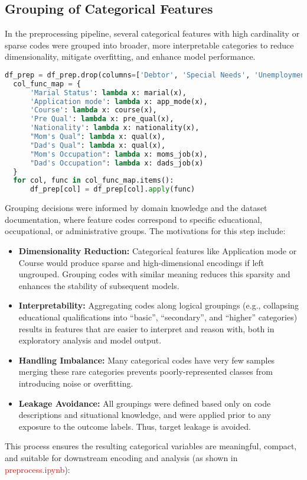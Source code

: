 \documentclass[twoside,final]{hcmut-report}
\begin{document}
\subsection{Grouping of Categorical Features}
In the preprocessing pipeline, several categorical features with high cardinality or sparse codes were grouped into broader, more interpretable categories to reduce dimensionality, mitigate overfitting, and enhance model performance.
\begin{lstlisting}[language=python]
  df_prep = df_prep.drop(columns=['Debtor', 'Special Needs', 'Unemployment rate', 'Inflation rate', 'GDP'])
  col_func_map = {
      'Marial Status': lambda x: marial(x),
      'Application mode': lambda x: app_mode(x),
      'Course': lambda x: course(x),
      'Pre Qual': lambda x: pre_qual(x),
      'Nationality': lambda x: nationality(x),
      "Mom's Qual": lambda x: qual(x),
      "Dad's Qual": lambda x: qual(x),
      "Mom's Occupation": lambda x: moms_job(x),
      "Dad's Occupation": lambda x: dads_job(x)
  }
  for col, func in col_func_map.items():
      df_prep[col] = df_prep[col].apply(func)
\end{lstlisting}
Grouping decisions were informed by domain knowledge and the dataset documentation, where feature codes correspond to specific educational, occupational, or administrative groups. The motivations for this step include:
\begin{itemize}
  \item \textbf{Dimensionality Reduction:} Categorical features like Application mode or Course would produce sparse and high-dimensional encodings if left ungrouped. Grouping codes with similar meaning reduces this sparsity and enhances the stability of subsequent models.
  \item \textbf{Interpretability:} Aggregating codes along logical groupings (e.g., collapsing educational qualifications into ``basic'', ``secondary'', and ``higher'' categories) results in features that are easier to interpret and reason with, both in exploratory analysis and model output.
  \item \textbf{Handling Imbalance:} Many categorical codes have very few samples merging these rare categories prevents poorly-represented classes from introducing noise or overfitting.
  \item \textbf{Leakage Avoidance:} All groupings were defined based only on code descriptions and situational knowledge, and were applied prior to any exposure to the outcome labels. Thus, target leakage is avoided.
\end{itemize}
This process ensures the resulting categorical variables are meaningful, compact, and suitable for downstream encoding and analysis (as shown in \textcolor{red}{preprocess.ipynb}):
\end{document}
